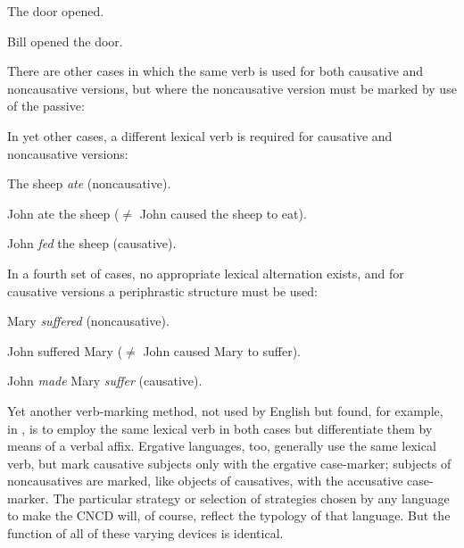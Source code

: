 \ea\label{ex:3:65}
 The door opened.
\z

\ea\label{ex:3:66}
 Bill opened the door.
\z

There are other cases in which the same verb is used for both causative and noncausative versions, but where the noncausative version must be marked by use of the passive:

\z


\z

\z

In yet other cases, a different lexical verb is required for causative and noncausative versions:

\ea\label{ex:3:70}
 The sheep \textit{ate} (noncausative).
\z

\ea\label{ex:3:71}
 John ate the sheep ($\neq$ John caused the sheep to eat).
\z

\ea\label{ex:3:72}
 John \textit{fed} the sheep (causative). 
\z

In a fourth set of cases, no appropriate lexical alternation exists, and for causative versions a periphrastic structure must be used:

\ea\label{ex:3:73}
 Mary \textit{suffered} (noncausative).
\z

\ea\label{ex:3:74}
John suffered Mary ($\neq$ John caused Mary to suffer).
\z

\ea\label{ex:3:75}
 John \textit{made} Mary \textit{suffer} (causative). 
\z

Yet another verb-marking method, not used by English but found, for example, in , is to employ the same lexical verb in both cases but differentiate them by means of a verbal affix. Ergative languages, too, generally use the same lexical verb, but mark causative subjects only with the ergative case-marker; subjects of noncausatives are marked, like objects of causatives, with the accusative case-marker. The particular strategy or selection of strategies chosen by any language to make the CNCD will, of course, reflect the typology of that language. But the function of all of these varying devices is identical.

